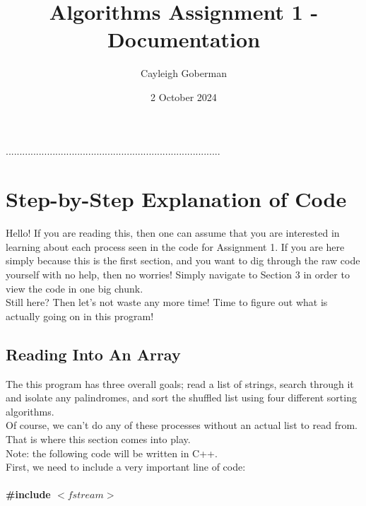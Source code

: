 \documentclass{article}
\title{Algorithms Assignment 1 - Documentation}
\author{Cayleigh Goberman}
\date{2 October 2024}
\begin{document}
\maketitle

\begin{center}
..............................................................................
\end{center}

\tableofcontents

\pagebreak

\section{Step-by-Step Explanation of Code}
Hello! If you are reading this, then one can assume that you are interested in learning about each process seen in the code for Assignment 1. If you are here simply because this is the first section, and you want to dig through the raw code yourself with no help, then no worries! Simply navigate to Section 3 in order to view the code in one big chunk.
\\
Still here? Then let's not waste any more time! Time to figure out what is actually going on in this program!
\\
\subsection{Reading Into An Array}
The this program has three overall goals; read a list of strings, search through it and isolate any palindromes, and sort the shuffled list using four different sorting algorithms. 
\\ Of course, we can't do any of these processes without an actual list to read from. That is where this section comes into play. 
\\Note: the following code will be written in C++.
\\ First, we need to include a very important line of code:
\textbf{
\\
\\\#include $<fstream>$
\\~\\
}
\end{document}
